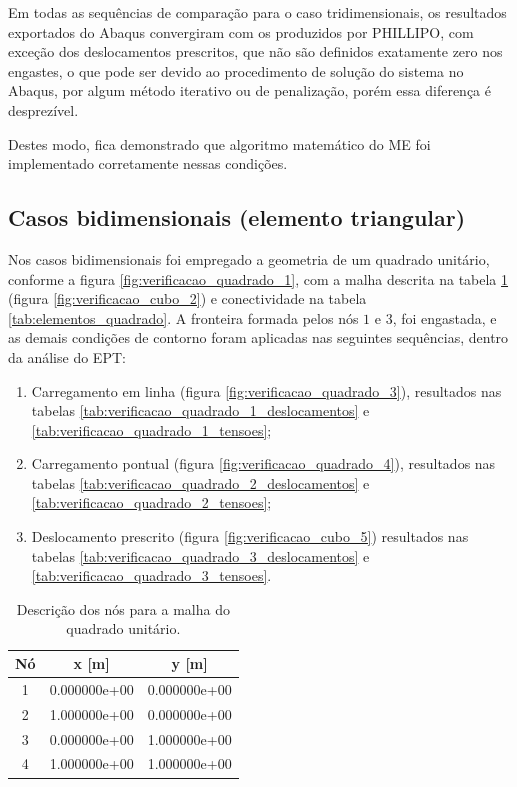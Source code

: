 Em todas as sequências de comparação para o caso tridimensionais, os resultados exportados do Abaqus convergiram com os produzidos por PHILLIPO, com exceção dos deslocamentos prescritos, que não são definidos exatamente zero nos engastes, o que pode ser devido ao procedimento de solução do sistema no Abaqus, por algum método iterativo ou de penalização, porém essa diferença é desprezível.

Destes modo, fica demonstrado que algoritmo matemático do ME foi implementado corretamente nessas condições. 

\subsection{Casos bidimensionais (elemento triangular)}

Nos casos bidimensionais foi empregado a geometria de um quadrado unitário, conforme a figura \ref{fig:verificacao_quadrado_1}, com a malha descrita na tabela \ref{tab:nos_quadrado} (figura \ref{fig:verificacao_cubo_2}) e conectividade na tabela \ref{tab:elementos_quadrado}. A fronteira formada pelos nós $1$ e $3$, foi engastada, e as demais condições de contorno foram aplicadas nas seguintes sequências, dentro da análise do EPT:

\begin{enumerate}
    \item Carregamento em linha (figura \ref{fig:verificacao_quadrado_3}), resultados nas tabelas \ref{tab:verificacao_quadrado_1_deslocamentos} e \ref{tab:verificacao_quadrado_1_tensoes};
    \item Carregamento pontual (figura \ref{fig:verificacao_quadrado_4}), resultados nas tabelas \ref{tab:verificacao_quadrado_2_deslocamentos} e \ref{tab:verificacao_quadrado_2_tensoes};
    \item Deslocamento prescrito (figura \ref{fig:verificacao_cubo_5}) resultados nas tabelas \ref{tab:verificacao_quadrado_3_deslocamentos} e \ref{tab:verificacao_quadrado_3_tensoes}.
\end{enumerate}

\begin{table}
    \centering
    \caption{Descrição dos nós para a malha do quadrado unitário.}
    \begin{tabular}{c | c c}
        \toprule
        \textbf{Nó} & \textbf{x} [m]  & \textbf{y}  [m] \\
        \midrule
        1 & 0.000000e+00 & 0.000000e+00 \\
        2 & 1.000000e+00 & 0.000000e+00 \\
        3 & 0.000000e+00 & 1.000000e+00 \\
        4 & 1.000000e+00 & 1.000000e+00 \\
        \bottomrule
    \end{tabular}
    \label{tab:nos_quadrado}
\end{table}

